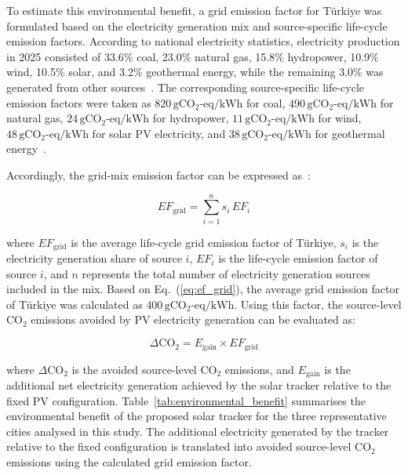 \documentclass[preprint,3p,12pt]{elsarticle}
\begin{document}
To estimate this environmental benefit, a grid emission factor for
Türkiye was formulated based on the electricity generation mix
and source-specific life-cycle emission factors. According to
national electricity statistics, electricity production in 2025
consisted of 33.6\% coal, 23.0\% natural gas, 15.8\% hydropower,
10.9\% wind, 10.5\% solar, and 3.2\% geothermal energy, while the
remaining 3.0\% was generated from other sources~\cite{Enerji2025}.
The corresponding source-specific life-cycle emission factors were
taken as $820\,\mathrm{gCO_2\text{-}eq/kWh}$ for coal,
$490\,\mathrm{gCO_2\text{-}eq/kWh}$ for natural gas,
$24\,\mathrm{gCO_2\text{-}eq/kWh}$ for hydropower,
$11\,\mathrm{gCO_2\text{-}eq/kWh}$ for wind,
$48\,\mathrm{gCO_2\text{-}eq/kWh}$ for solar PV electricity, and
$38\,\mathrm{gCO_2\text{-}eq/kWh}$ for geothermal
energy~\cite{WNA2025}.

Accordingly, the grid-mix emission factor can be expressed
as~\cite{Yavasoglu2025}:

\begin{equation}
    EF_{\mathrm{grid}} = \sum_{i=1}^{n} s_i\, EF_i
    \label{eq:ef_grid}
\end{equation}

where $EF_{\mathrm{grid}}$ is the average life-cycle grid emission
factor of Türkiye, $s_i$ is the electricity generation share of
source $i$, $EF_i$ is the life-cycle emission factor of source $i$,
and $n$ represents the total number of electricity generation sources
included in the mix. Based on Eq.~(\ref{eq:ef_grid}), the average
grid emission factor of Türkiye was calculated as
$400\,\mathrm{gCO_2\text{-}eq/kWh}$. Using this factor, the
source-level CO$_2$ emissions avoided by PV electricity generation
can be evaluated as:

\begin{equation}
    \Delta\mathrm{CO}_2 = E_{\mathrm{gain}} \times EF_{\mathrm{grid}}
    \label{eq:avoided_co2}
\end{equation}

where $\Delta\mathrm{CO}_2$ is the avoided source-level CO$_2$
emissions, and $E_{\mathrm{gain}}$ is the additional net electricity
generation achieved by the solar tracker relative to the fixed PV
configuration. Table~\ref{tab:environmental_benefit} summarises the
environmental benefit of the proposed solar tracker for the three
representative cities analysed in this study. The additional
electricity generated by the tracker relative to the fixed
configuration is translated into avoided source-level CO$_2$
emissions using the calculated grid emission factor.
\end{document}
